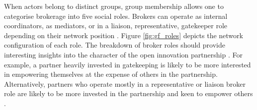 When actors belong to distinct groups, group membership allows one to categorise brokerage into five social roles. Brokers can operate as internal coordinators, as mediators, or in a liaison, representative, gatekeeper role depending on their network position \citep{gould1989structures}. Figure \ref{fig:gf_roles} depicts the network configuration of each role. The breakdown of broker roles should provide interesting insights into the character of the open innovation partnership \citep{spiro2013extended}. For example, a partner heavily invested in gatekeeping is likely to be more interested in empowering themselves at the expense of others in the partnership. Alternatively, partners who operate mostly in a representative or liaison broker role are likely to be more invested in the partnership and keen to empower others \citep{spiro2013extended}. \medskip

